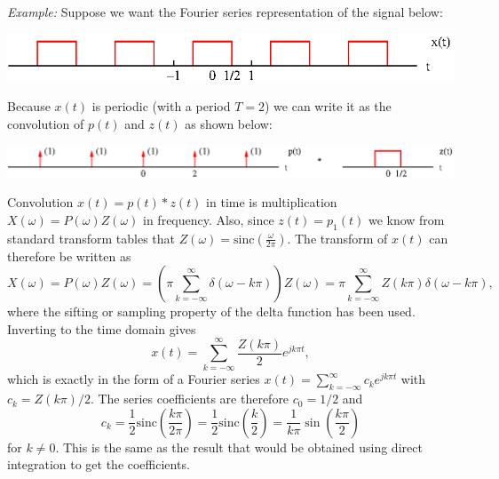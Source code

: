 \documentclass[10pt]{beamer}
\newcommand{\conv}{\ast}
\begin{document}
{\em Example:}  Suppose we want the Fourier series representation of the signal below:
\begin{center}
  \includegraphics{exampleftfs}
\end{center}
Because $x(t)$ is periodic (with a period $T=2$) we can write it as the convolution of $p(t)$ and $z(t)$ as shown below:
\begin{center}
  \psfrag{*}{$\conv$}
  \includegraphics{exampleftfsdec}
\end{center}
Convolution $x(t) = p(t) \conv z(t)$ in time is multiplication $X(\omega) = P(\omega) Z(\omega)$ in frequency.  Also, since $z(t) = p_1(t)$ we know from standard transform tables that $Z(\omega) = \text{sinc} \left( \frac{\omega}{2\pi} \right)$.  The transform of $x(t)$ can therefore be written as
\begin{equation*}
  X(\omega) = P(\omega) Z(\omega) = \left( \pi \sum_{k=-\infty}^{\infty} \delta(\omega - k \pi) \right) Z(\omega)
  = \pi \sum_{k=-\infty}^{\infty} Z(k \pi) \delta(\omega - k \pi),
\end{equation*}
where the sifting or sampling property of the delta function has been used.  Inverting to the time domain gives
\begin{equation*}
  x(t) = \sum_{k=-\infty}^{\infty} \frac{Z(k \pi)}{2} e^{j k \pi t},
\end{equation*}
which is exactly in the form of a Fourier series $x(t) = \sum_{k=-\infty}^{\infty} c_k e^{j k \pi t}$ with $c_k = Z(k \pi)/2$.  The series coefficients are therefore $c_0 = 1/2$ and
\begin{equation*}
  c_k = \frac{1}{2} \text{sinc} \left( \frac{k\pi}{2\pi} \right)
  = \frac{1}{2} \text{sinc} \left( \frac{k}{2} \right) = \frac{1}{k \pi} \sin \left( \frac{k \pi}{2} \right)
\end{equation*}
for $k \neq 0$.  This is the same as the result that would be obtained using direct integration to get the coefficients.

%
\end{document}
